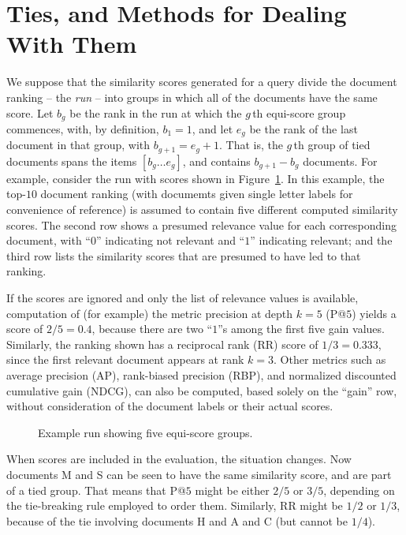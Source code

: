 \section{Ties, and Methods for Dealing With Them}
\label{sec-ties}


We suppose that the similarity scores generated for a query divide
the document ranking -- the {\emph{run}} -- into groups in which all
of the documents have the same score.
Let $b_g$ be the rank in the run at which the $g$\,th equi-score
group commences, with, by definition, $b_1=1$, and let $e_g$ be the
rank of the last document in that group, with $b_{g+1}=e_g+1$.
That is, the $g$\,th group of tied documents spans the items
$[b_g\ldots e_g]$, and contains $b_{g+1}-b_g$ documents.
For example, consider the run with scores shown in
Figure~\ref{fig-example}.
In this example, the top-$10$ document ranking (with documemts given
single letter labels for convenience of reference) is assumed to
contain five different computed similarity scores.
The second row shows a presumed relevance value for each
corresponding document, with ``$0$'' indicating not relevant and
``$1$'' indicating relevant; and the third row lists the similarity
scores that are presumed to have led to that ranking.

If the scores are ignored and only the list of relevance values is
available, computation of (for example) the metric precision at depth
$k=5$ (P@$5$) yields a score of $2/5=0.4$, because there are two
``$1$''s among the first five gain values.
Similarly, the ranking shown has a reciprocal rank (RR) score of
$1/3=0.333$, since the first relevant document appears at rank $k=3$.
Other metrics such as average precision (AP), rank-biased precision
(RBP), and normalized discounted cumulative gain (NDCG), can also be
computed, based solely on the ``gain'' row, without consideration of
the document labels or their actual scores.

\begin{figure}[t]
\centering

\caption{Example run showing five equi-score groups.
\label{fig-example}}
\end{figure}

When scores are included in the evaluation, the situation changes.
Now documents M and S can be seen to have the same similarity score,
and are part of a tied group.
That means that P@$5$ might be either $2/5$ or $3/5$, depending on
the tie-breaking rule employed to order them.
Similarly, RR might be $1/2$ or $1/3$, because of the tie involving
documents H and A and C (but cannot be $1/4$).

